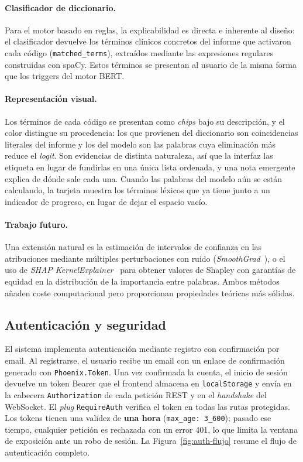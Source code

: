 \paragraph{Clasificador de diccionario.}
Para el motor basado en reglas, la explicabilidad es directa e inherente al diseño: el clasificador devuelve los términos clínicos concretos del informe que activaron cada código (\texttt{matched\_terms}), extraídos mediante las expresiones regulares construidas con spaCy. Estos términos se presentan al usuario de la misma forma que los triggers del motor BERT.

\paragraph{Representación visual.}
Los términos de cada código se presentan como \emph{chips} bajo su descripción, y el color distingue su procedencia: los que provienen del diccionario son coincidencias literales del informe y los del modelo son las palabras cuya eliminación más reduce el \emph{logit}. Son evidencias de distinta naturaleza, así que la interfaz las etiqueta en lugar de fundirlas en una única lista ordenada, y una nota emergente explica de dónde sale cada una. Cuando las palabras del modelo aún se están calculando, la tarjeta muestra los términos léxicos que ya tiene junto a un indicador de progreso, en lugar de dejar el espacio vacío.

\paragraph{Trabajo futuro.}
Una extensión natural es la estimación de intervalos de confianza en las atribuciones mediante múltiples perturbaciones con ruido (\emph{SmoothGrad}~\cite{Smilkov17}), o el uso de \emph{SHAP KernelExplainer}~\cite{Lundberg17} para obtener valores de Shapley con garantías de equidad en la distribución de la importancia entre palabras. Ambos métodos añaden coste computacional pero proporcionan propiedades teóricas más sólidas.

\subsection{Autenticación y seguridad}
\label{sec:seguridad}

El sistema implementa autenticación mediante registro con confirmación por email. Al registrarse, el usuario recibe un email con un enlace de confirmación generado con \texttt{Phoenix.Token}. Una vez confirmada la cuenta, el inicio de sesión devuelve un token Bearer que el frontend almacena en \texttt{localStorage} y envía en la cabecera \texttt{Authorization} de cada petición REST y en el \emph{handshake} del WebSocket. El \emph{plug} \texttt{RequireAuth} verifica el token en todas las rutas protegidas. Los tokens tienen una validez de \textbf{una hora} (\texttt{max\_age: 3\_600}); pasado ese tiempo, cualquier petición es rechazada con un error 401, lo que limita la ventana de exposición ante un robo de sesión. La Figura~\ref{fig:auth-flujo} resume el flujo de autenticación completo.

